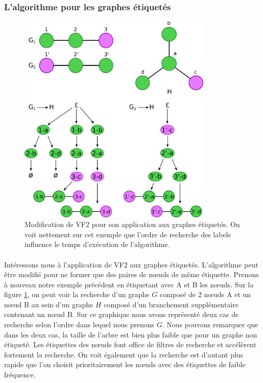 \documentclass[12pt,french,twoside]{report}
\begin{document}
\subsubsection{L'algorithme pour les graphes étiquetés}


\begin{figure}[!ht]
  \begin{center}
    \includegraphics[width=350px]{Figures/s2m/recherche/VF2_labels.png}
    \caption{\label{vf2_labels}Modification de VF2 pour son application aux graphes étiquetés.
    On voit nettement sur cet exemple que l'ordre de recherche des labels influence le temps d'exécution de l'algorithme.}
  \end{center}
\end{figure}

\paragraph{}Intéressons nous à l'application de VF2 aux graphes étiquetés.
L'algorithme peut être modifié pour ne former que des paires de n\oe{}uds de même étiquette.
Prenons à nouveau notre exemple précédent en étiquetant avec A et B les n\oe{}uds.
Sur la figure \ref{vf2_labels}, on peut voir la recherche d'un graphe $G$ composé de 2 n\oe{}uds A et un n\oe{}ud B au sein d'un graphe $H$
composé d'un branchement supplémentaire contenant un n\oe{}ud B.
Sur ce graphique nous avons représenté deux cas de recherche selon l'ordre dans lequel nous prenons $G$.
Nous pouvons remarquer que dans les deux cas, la taille de l'arbre est bien plus faible que pour un graphe non étiqueté.
Les étiquettes des n\oe{}uds font office de filtres de recherche et accélèrent fortement la recherche.
On voit également que la recherche est d'autant plus rapide que l'on choisit prioritairement les n\oe{}uds avec des étiquettes de faible fréquence.
\end{document}
